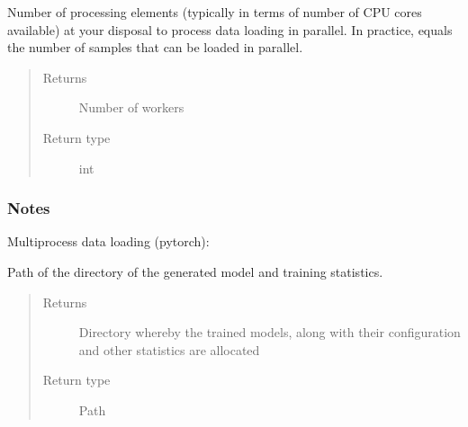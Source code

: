 \documentclass[letterpaper,10pt,english]{sphinxmanual}
\begin{document}
\begin{fulllineitems}
\begin{fulllineitems}
\label{\detokenize{code:gpt2_summarizer.GPT2Summarizer.num_workers}}
\sphinxAtStartPar
Number of processing elements (typically in terms of number of CPU cores
available) at your disposal to process data loading in parallel. In practice,
 equals the number of samples that can be loaded in parallel.
\begin{quote}\begin{description}
\item[{Returns}] \leavevmode
\sphinxAtStartPar
Number of workers

\item[{Return type}] \leavevmode
\sphinxAtStartPar
int

\end{description}\end{quote}
\subsubsection*{Notes}

\sphinxAtStartPar
Multi\sphinxhyphen{}process data loading (pytorch): 

\end{fulllineitems}


\begin{fulllineitems}
\label{\detokenize{code:gpt2_summarizer.GPT2Summarizer.output_dir}}
\sphinxAtStartPar
Path of the directory of the generated model and training statistics.
\begin{quote}\begin{description}
\item[{Returns}] \leavevmode
\sphinxAtStartPar
Directory whereby the trained models, along with their configuration and
other statistics are allocated

\item[{Return type}] \leavevmode
\sphinxAtStartPar
Path

\end{description}\end{quote}


\end{fulllineitems}
\end{fulllineitems}
\end{document}
